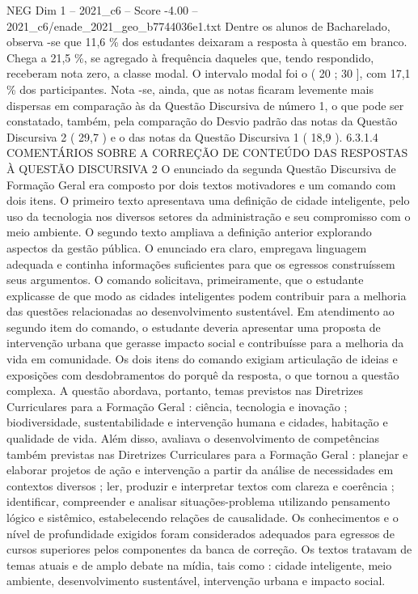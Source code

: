 \begin{textsample}{NEG Dim 1 – 2021\_c6 – Score -4.00 – 2021\_c6/enade\_2021\_geo\_b7744036e1.txt}
Dentre os alunos de Bacharelado, observa -se que 11,6 \% dos estudantes deixaram a resposta à questão em branco.
Chega a 21,5 \%, se agregado à frequência daqueles que, tendo respondido, receberam nota zero, a classe modal.
O intervalo modal foi o ( 20 ; 30 ], com 17,1 \% dos participantes.
Nota -se, ainda, que as notas ficaram levemente mais dispersas em comparação às da Questão Discursiva de número 1, o que pode ser constatado, também, pela comparação do Desvio padrão das notas da Questão Discursiva 2 ( 29,7 ) e o das notas da Questão Discursiva 1 ( 18,9 ). 6.3.1.4 COMENTÁRIOS SOBRE A CORREÇÃO DE CONTEÚDO DAS RESPOSTAS À QUESTÃO DISCURSIVA 2 O enunciado da segunda Questão Discursiva de Formação Geral era composto por dois textos motivadores e um comando com dois itens.
O primeiro texto apresentava uma definição de cidade inteligente, pelo uso da tecnologia nos diversos setores da administração e seu compromisso com o meio ambiente.
O segundo texto ampliava a definição anterior explorando aspectos da gestão pública.
O enunciado era claro, empregava linguagem adequada e continha informações suficientes para que os egressos construíssem seus argumentos.
O comando solicitava, primeiramente, que o estudante explicasse de que modo as cidades inteligentes podem contribuir para a melhoria das questões relacionadas ao desenvolvimento sustentável.
Em atendimento ao segundo item do comando, o estudante deveria apresentar uma proposta de intervenção urbana que gerasse impacto social e contribuísse para a melhoria da vida em comunidade.
Os dois itens do comando exigiam articulação de ideias e exposições com desdobramentos do porquê da resposta, o que tornou a questão complexa.
A questão abordava, portanto, temas previstos nas Diretrizes Curriculares para a Formação Geral : ciência, tecnologia e inovação ; biodiversidade, sustentabilidade e intervenção humana e cidades, habitação e qualidade de vida.
Além disso, avaliava o desenvolvimento de competências também previstas nas Diretrizes Curriculares para a Formação Geral : planejar e elaborar projetos de ação e intervenção a partir da análise de necessidades em contextos diversos ; ler, produzir e interpretar textos com clareza e coerência ; identificar, compreender e analisar situações-problema utilizando pensamento lógico e sistêmico, estabelecendo relações de causalidade.
Os conhecimentos e o nível de profundidade exigidos foram considerados adequados para egressos de cursos superiores pelos componentes da banca de correção.
Os textos tratavam de temas atuais e de amplo debate na mídia, tais como : cidade inteligente, meio ambiente, desenvolvimento sustentável, intervenção urbana e impacto social.

\end{textsample}
